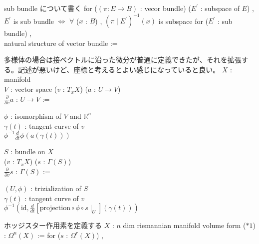 \begin{Definition}
\itemnote
  sub bundle について書く
\itemdefi
  for (\((\pi : E \to B)\) : vecor bundle) (\(E^{\prime}\) : subspace of \(E\)) ,\\
  \(E^{\prime}\) is sub bundle \(\iff\) \(\forall\) (\(x\) : \(B\)) , \((\pi \mid E^{\prime})^{-1}(x)\) is subspace
\itemdefi
  for (\(E^{\prime}\) : sub bundle) ,\\
  natural structure of vector bundle := 
\end{Definition}

\begin{Definition}
\itemnote
  多様体の場合は接ベクトルに沿った微分が普通に定義できたが、それを拡張する。記述が悪いけど、座標と考えるとよい感じになっていると良い。
\itemwhen
  \Fix \(X\) : manifold \\
\itemdefi
  \Fix \(V\) : vector space
  \For (\(v\) : \(T_x X\)) (\(a\) : \(U \to V\)) \\
  \Define \(\frac{\partial}{\partial v} a\) : \(U \to V\) :=
  \begin{indentblock}
    \Take \(\phi\) : isomorphism of \(V\) and \(\mathbb{R}^n\) \\
    \Take \(\gamma(t)\) : tangent curve of \(v\) \\
    \Return \(\phi^{-1} \frac{d}{dt} \phi (a (\gamma (t)))\)
  \end{indentblock}
\itemdefi
  \Fix \(S\) : bundle on \(X\) \\
  \For (\(v\) : \(T_x X\)) (\(s\) : \(\Gamma(S)\)) \\
  \Define \(\frac{\partial}{\partial v} s\) : \(\Gamma(S)\) :=
  \begin{indentblock}
    \Take \((U , \phi)\) : trizialization of \(S\) \\
    \Take \(\gamma(t)\) : tangent curve of \(v\) \\
    \Return \(\phi^{-1} (\text{id} , \frac{d}{dt} [\text{projection} \circ \phi \circ s \mid_{U}](\gamma(t)))\)
  \end{indentblock}
\end{Definition}

\begin{Definition}
\itemnote
  ホッジスター作用素を定義する
\itemwhen
  \Fix \(X\) : \(n\) dim riemannian manifold
\itemdefi
  \Define volume form (\(*1\)) : \(\Omega^n(X)\) := 
  \Define for (\(s\) : \(\Omega^r(X)\)) , 
\end{Definition}